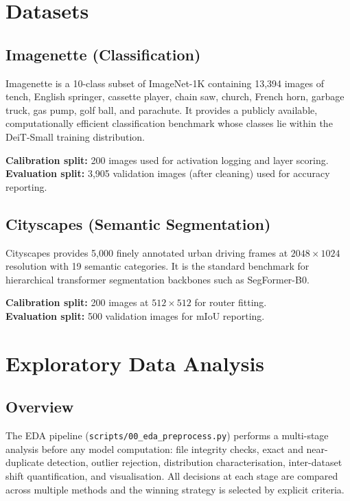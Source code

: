 \documentclass[12pt,a4paper]{article}
\begin{document}
\section{Datasets}
\label{sec:datasets}

\subsection{Imagenette (Classification)}

Imagenette is a 10-class subset of ImageNet-1K \cite{russakovsky2015imagenet} containing 13,394 images of tench, English springer, cassette player, chain saw, church, French horn, garbage truck, gas pump, golf ball, and parachute. It provides a publicly available, computationally efficient classification benchmark whose classes lie within the DeiT-Small training distribution.

\textbf{Calibration split:} 200 images used for activation logging and layer scoring. \\
\textbf{Evaluation split:} 3,905 validation images (after cleaning) used for accuracy reporting.

\subsection{Cityscapes (Semantic Segmentation)}

Cityscapes \cite{cordts2016cityscapes} provides 5,000 finely annotated urban driving frames at $2048\times1024$ resolution with 19 semantic categories. It is the standard benchmark for hierarchical transformer segmentation backbones such as SegFormer-B0.

\textbf{Calibration split:} 200 images at $512\times512$ for router fitting. \\
\textbf{Evaluation split:} 500 validation images for mIoU reporting.

\section{Exploratory Data Analysis}
\label{sec:eda}

\subsection{Overview}

The EDA pipeline (\texttt{scripts/00\_eda\_preprocess.py}) performs a multi-stage analysis before any model computation: file integrity checks, exact and near-duplicate detection, outlier rejection, distribution characterisation, inter-dataset shift quantification, and visualisation. All decisions at each stage are compared across multiple methods and the winning strategy is selected by explicit criteria.
\end{document}
